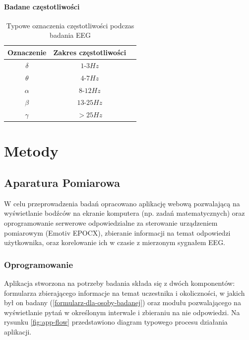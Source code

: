 \documentclass{./assets/wfis}
\begin{document}
\subsubsection{Badane częstotliwości}

\begin{table}[h]
    \centering
    \begin{tabular}{|c|c|c|}
        \hline
        Oznaczenie & Zakres częstotliwości \\
        \hline
        $\delta$ & $1$-$3Hz$  \\
        $\theta$ & $4$-$7Hz$ \\
        $\alpha$ & $8$-$12Hz$ \\
        $\beta$  & $13$-$25Hz$ \\
        $\gamma$ & $>25Hz$ \\
        \hline
    \end{tabular}
    \caption{Typowe oznaczenia częstotliwości podczas badania EEG}
    \label{tab:freqs}
\end{table}
\chapter{Metody}

\section{Aparatura Pomiarowa}\label{aparatura-pomiarowa}

W celu przeprowadzenia badań opracowano aplikację webową pozwalającą na wyświetlanie bodźców na ekranie komputera (np. zadań matematycznych) oraz oprogramowanie serwerowe odpowiedzialne za sterowanie urządzeniem pomiarowym (Emotiv EPOCX), zbieranie informacji na temat odpowiedzi użytkownika, oraz korelowanie ich w czasie z mierzonym sygnałem EEG.

\subsection{Oprogramowanie}
 
Aplikacja stworzona na potrzeby badania składa się z dwóch komponentów: formularza zbierającego informacje na temat uczestnika i okoliczności, w jakich był on badany (\autoref{formularz-dla-osoby-badanej}) oraz modułu pozwalającego na wyświetlanie pytań w określonym interwale i zbieraniu na nie odpowiedzi. Na rysunku \ref{fig:app-flow} przedstawiono diagram typowego procesu działania aplikacji.
\end{document}
